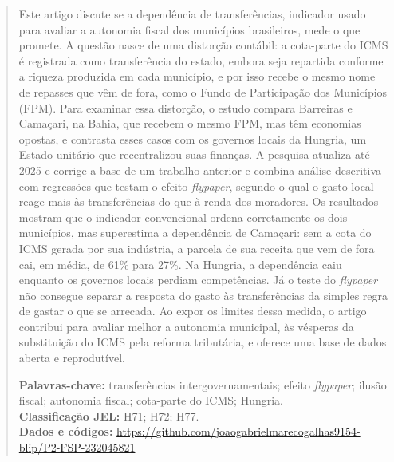 \begin{abstract}
\noindent Este artigo discute se a dependência de transferências, indicador usado para avaliar a autonomia fiscal dos municípios brasileiros, mede o que promete. A questão nasce de uma distorção contábil: a cota-parte do ICMS é registrada como transferência do estado, embora seja repartida conforme a riqueza produzida em cada município, e por isso recebe o mesmo nome de repasses que vêm de fora, como o Fundo de Participação dos Municípios (FPM). Para examinar essa distorção, o estudo compara Barreiras e Camaçari, na Bahia, que recebem o mesmo FPM, mas têm economias opostas, e contrasta esses casos com os governos locais da Hungria, um Estado unitário que recentralizou suas finanças. A pesquisa atualiza até 2025 e corrige a base de um trabalho anterior e combina análise descritiva com regressões que testam o efeito \textit{flypaper}, segundo o qual o gasto local reage mais às transferências do que à renda dos moradores. Os resultados mostram que o indicador convencional ordena corretamente os dois municípios, mas superestima a dependência de Camaçari: sem a cota do ICMS gerada por sua indústria, a parcela de sua receita que vem de fora cai, em média, de 61\% para 27\%. Na Hungria, a dependência caiu enquanto os governos locais perdiam competências. Já o teste do \textit{flypaper} não consegue separar a resposta do gasto às transferências da simples regra de gastar o que se arrecada. Ao expor os limites dessa medida, o artigo contribui para avaliar melhor a autonomia municipal, às vésperas da substituição do ICMS pela reforma tributária, e oferece uma base de dados aberta e reprodutível.

\vspace{0.5em}
\noindent\textbf{Palavras-chave:} transferências intergovernamentais; efeito \textit{flypaper}; ilusão fiscal; autonomia fiscal; cota-parte do ICMS; Hungria.\\
\noindent\textbf{Classificação JEL:} H71; H72; H77.\\
\noindent\textbf{Dados e códigos:} \url{https://github.com/joaogabrielmarecogalhas9154-blip/P2-FSP-232045821}
\end{abstract}
